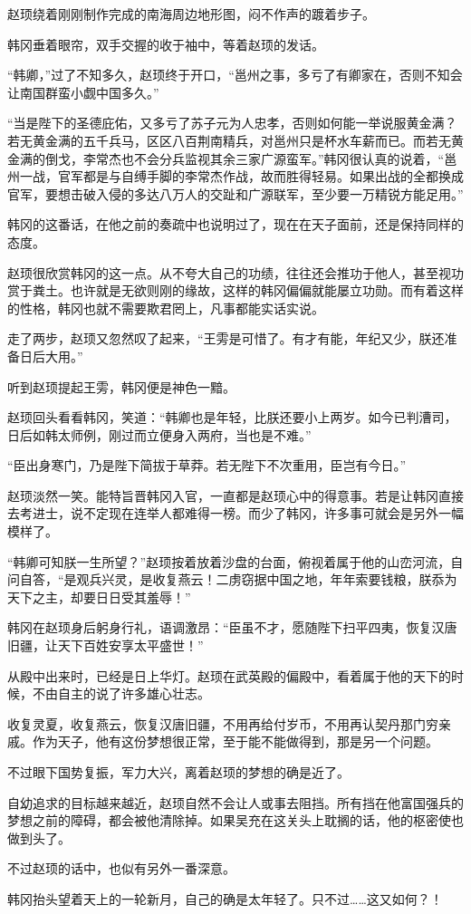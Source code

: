 赵顼绕着刚刚制作完成的南海周边地形图，闷不作声的踱着步子。

韩冈垂着眼帘，双手交握的收于袖中，等着赵顼的发话。

“韩卿，”过了不知多久，赵顼终于开口，“邕州之事，多亏了有卿家在，否则不知会让南国群蛮小觑中国多久。”

“当是陛下的圣德庇佑，又多亏了苏子元为人忠孝，否则如何能一举说服黄金满？若无黄金满的五千兵马，区区八百荆南精兵，对邕州只是杯水车薪而已。而若无黄金满的倒戈，李常杰也不会分兵监视其余三家广源蛮军。”韩冈很认真的说着，“邕州一战，官军都是与自缚手脚的李常杰作战，故而胜得轻易。如果出战的全都换成官军，要想击破入侵的多达八万人的交趾和广源联军，至少要一万精锐方能足用。”

韩冈的这番话，在他之前的奏疏中也说明过了，现在在天子面前，还是保持同样的态度。

赵顼很欣赏韩冈的这一点。从不夸大自己的功绩，往往还会推功于他人，甚至视功赏于粪土。也许就是无欲则刚的缘故，这样的韩冈偏偏就能屡立功勋。而有着这样的性格，韩冈也就不需要欺君罔上，凡事都能实话实说。

走了两步，赵顼又忽然叹了起来，“王雱是可惜了。有才有能，年纪又少，朕还准备日后大用。”

听到赵顼提起王雱，韩冈便是神色一黯。

赵顼回头看看韩冈，笑道：“韩卿也是年轻，比朕还要小上两岁。如今已判漕司，日后如韩太师例，刚过而立便身入两府，当也是不难。”

“臣出身寒门，乃是陛下简拔于草莽。若无陛下不次重用，臣岂有今日。”

赵顼淡然一笑。能特旨晋韩冈入官，一直都是赵顼心中的得意事。若是让韩冈直接去考进士，说不定现在连举人都难得一榜。而少了韩冈，许多事可就会是另外一幅模样了。

“韩卿可知朕一生所望？”赵顼按着放着沙盘的台面，俯视着属于他的山峦河流，自问自答，“是观兵兴灵，是收复燕云！二虏窃据中国之地，年年索要钱粮，朕忝为天下之主，却要日日受其羞辱！”

韩冈在赵顼身后躬身行礼，语调激昂：“臣虽不才，愿随陛下扫平四夷，恢复汉唐旧疆，让天下百姓安享太平盛世！”

从殿中出来时，已经是日上华灯。赵顼在武英殿的偏殿中，看着属于他的天下的时候，不由自主的说了许多雄心壮志。

收复灵夏，收复燕云，恢复汉唐旧疆，不用再给付岁币，不用再认契丹那门穷亲戚。作为天子，他有这份梦想很正常，至于能不能做得到，那是另一个问题。

不过眼下国势复振，军力大兴，离着赵顼的梦想的确是近了。

自幼追求的目标越来越近，赵顼自然不会让人或事去阻挡。所有挡在他富国强兵的梦想之前的障碍，都会被他清除掉。如果吴充在这关头上耽搁的话，他的枢密使也做到头了。

不过赵顼的话中，也似有另外一番深意。

韩冈抬头望着天上的一轮新月，自己的确是太年轻了。只不过……这又如何？！

